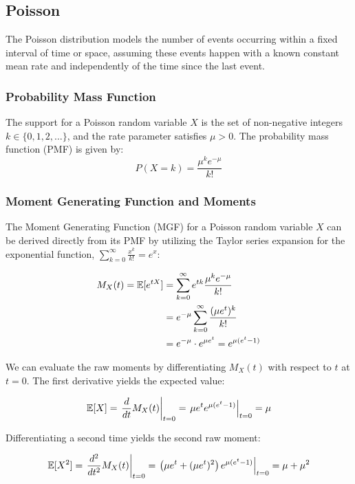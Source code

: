 \clearpage
\subsection{Poisson}

The Poisson distribution models the number of events occurring within a fixed interval of time or space, assuming these events happen with a known constant mean rate and independently of the time since the last event.

\subsubsection{Probability Mass Function}
The support for a Poisson random variable $X$ is the set of non-negative integers $k \in \{0, 1, 2, \dots\}$, and the rate parameter satisfies $\mu > 0$. The probability mass function (PMF) is given by:
\begin{equation}
	P(X = k) = \frac{\mu^k e^{-\mu}}{k!}
	\label{pmf:poisson}
\end{equation}

\subsubsection{Moment Generating Function and Moments}
The Moment Generating Function (MGF) for a Poisson random variable $X$ can be derived directly from its PMF by utilizing the Taylor series expansion for the exponential function, $\sum_{k=0}^{\infty} \frac{x^k}{k!} = e^x$:

\begin{align*}
	M_X(t) = \mathbb{E}[e^{tX}] &= \sum_{k=0}^{\infty} e^{tk} \frac{\mu^k e^{-\mu}}{k!} \\
	&= e^{-\mu} \sum_{k=0}^{\infty} \frac{(\mu e^t)^k}{k!} \\
	&= e^{-\mu} \cdot e^{\mu e^t} = e^{\mu(e^t - 1)}
\end{align*}

We can evaluate the raw moments by differentiating $M_X(t)$ with respect to $t$ at $t = 0$. The first derivative yields the expected value:

	\[
	\mathbb{E}[X] = \left. \frac{d}{dt} M_X(t) \right|_{t=0} = \left. \mu e^t e^{\mu(e^t - 1)} \right|_{t=0} = \mu
	\]

Differentiating a second time yields the second raw moment:

	\[
	\mathbb{E}[X^2] = \left. \frac{d^2}{dt^2} M_X(t) \right|_{t=0} = \left. \left( \mu e^t + (\mu e^t)^2 \right) e^{\mu(e^t - 1)} \right|_{t=0} = \mu + \mu^2
	\]

